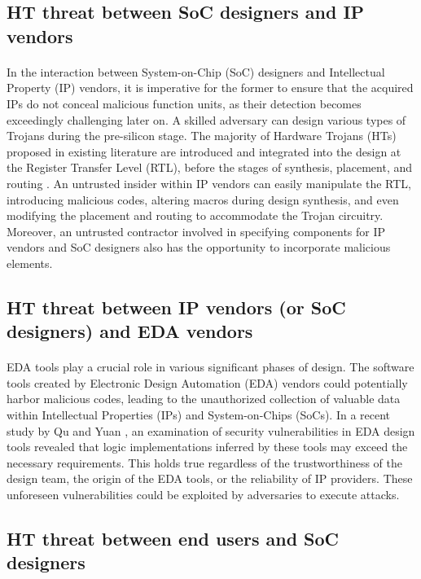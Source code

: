 \subsection{HT threat between SoC designers and IP vendors}
\paragraph*{}
In the interaction between System-on-Chip (SoC) designers and Intellectual Property (IP) vendors, it is imperative for the former to ensure that the acquired IPs do not conceal malicious function units, as their detection becomes exceedingly challenging later on. A skilled adversary can design various types of Trojans during the pre-silicon stage. The majority of Hardware Trojans (HTs) proposed in existing literature are introduced and integrated into the design at the Register Transfer Level (RTL), before the stages of synthesis, placement, and routing \cite{king2008designing}. An untrusted insider within IP vendors can easily manipulate the RTL, introducing malicious codes, altering macros during design synthesis, and even modifying the placement and routing to accommodate the Trojan circuitry. Moreover, an untrusted contractor involved in specifying components for IP vendors and SoC designers also has the opportunity to incorporate malicious elements.
\subsection{HT threat between IP vendors (or SoC designers) and EDA vendors}
\paragraph*{}
EDA tools play a crucial role in various significant phases of design. The software tools created by Electronic Design Automation (EDA) vendors could potentially harbor malicious codes, leading to the unauthorized collection of valuable data within Intellectual Properties (IPs) and System-on-Chips (SoCs). In a recent study by Qu and Yuan \cite{qu2014design}, an examination of security vulnerabilities in EDA design tools revealed that logic implementations inferred by these tools may exceed the necessary requirements. This holds true regardless of the trustworthiness of the design team, the origin of the EDA tools, or the reliability of IP providers. These unforeseen vulnerabilities could be exploited by adversaries to execute attacks.

\subsection{HT threat between end users and SoC designers}
